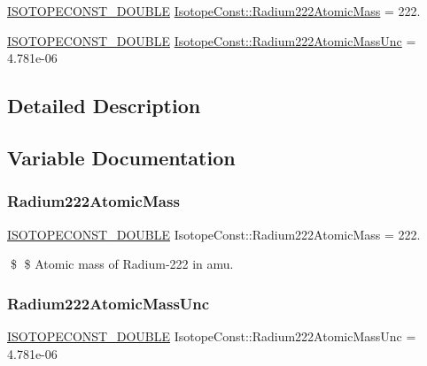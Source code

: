 \begin{DoxyCompactItemize}
\item 
\mbox{\hyperlink{group___isotope_const-_macros_ga8f45a7272ce02c0b4c65c44636ed719a}{I\+S\+O\+T\+O\+P\+E\+C\+O\+N\+S\+T\+\_\+\+D\+O\+U\+B\+LE}} \mbox{\hyperlink{group___isotope_const-_radium-_ra222_ga5faad257f02ef3c36805e4b4b00f5ef4}{Isotope\+Const\+::\+Radium222\+Atomic\+Mass}} = 222.
\item 
\mbox{\hyperlink{group___isotope_const-_macros_ga8f45a7272ce02c0b4c65c44636ed719a}{I\+S\+O\+T\+O\+P\+E\+C\+O\+N\+S\+T\+\_\+\+D\+O\+U\+B\+LE}} \mbox{\hyperlink{group___isotope_const-_radium-_ra222_gaa9caa44fc32b1086539907d97193a5bc}{Isotope\+Const\+::\+Radium222\+Atomic\+Mass\+Unc}} = 4.\+781e-\/06
\end{DoxyCompactItemize}


\subsection{Detailed Description}


\subsection{Variable Documentation}
\mbox{\label{group___isotope_const-_radium-_ra222_ga5faad257f02ef3c36805e4b4b00f5ef4}} 
\subsubsection{\texorpdfstring{Radium222\+Atomic\+Mass}{Radium222AtomicMass}}
{\footnotesize\ttfamily \mbox{\hyperlink{group___isotope_const-_macros_ga8f45a7272ce02c0b4c65c44636ed719a}{I\+S\+O\+T\+O\+P\+E\+C\+O\+N\+S\+T\+\_\+\+D\+O\+U\+B\+LE}} Isotope\+Const\+::\+Radium222\+Atomic\+Mass = 222.}

\$ \$ Atomic mass of Radium-\/222 in amu. \mbox{\label{group___isotope_const-_radium-_ra222_gaa9caa44fc32b1086539907d97193a5bc}} 
\subsubsection{\texorpdfstring{Radium222\+Atomic\+Mass\+Unc}{Radium222AtomicMassUnc}}
{\footnotesize\ttfamily \mbox{\hyperlink{group___isotope_const-_macros_ga8f45a7272ce02c0b4c65c44636ed719a}{I\+S\+O\+T\+O\+P\+E\+C\+O\+N\+S\+T\+\_\+\+D\+O\+U\+B\+LE}} Isotope\+Const\+::\+Radium222\+Atomic\+Mass\+Unc = 4.\+781e-\/06}

